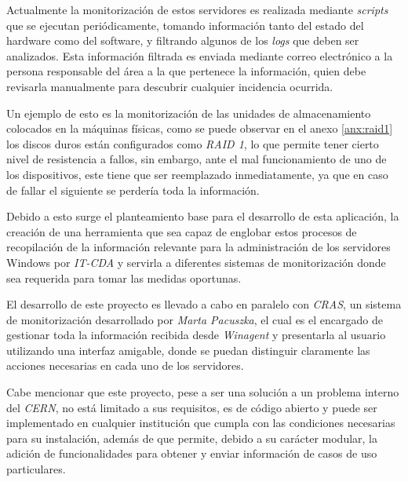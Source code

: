 Actualmente la monitorización de estos servidores es realizada mediante \textit{scripts} que se ejecutan periódicamente, tomando información tanto del estado del hardware como del software, y filtrando algunos de los \textit{logs} que deben ser analizados. Esta información filtrada es enviada mediante correo electrónico a la persona responsable del área a la que pertenece la información, quien debe revisarla manualmente para descubrir cualquier incidencia ocurrida.

Un ejemplo de esto es la monitorización de las unidades de almacenamiento colocados en la máquinas físicas, como se puede observar en el anexo \ref{anx:raid1} los discos duros están configurados como \textit{RAID 1}, lo que permite tener cierto nivel de resistencia a fallos, sin embargo, ante el mal funcionamiento de uno de los dispositivos, este tiene que ser reemplazado inmediatamente, ya que en caso de fallar el siguiente se perdería toda la información.



Debido a esto surge el planteamiento base para el desarrollo de esta aplicación, la creación de una herramienta que sea capaz de englobar estos procesos de recopilación de la información relevante para la administración de los servidores Windows  por \textit{IT-CDA} y servirla a diferentes sistemas de monitorización donde sea requerida para tomar las medidas oportunas.

El desarrollo de este proyecto es llevado a cabo en paralelo con \textit{CRAS}, un sistema de monitorización desarrollado por \textit{Marta Pacuszka}, el cual es el encargado de gestionar toda la información recibida desde \textit{Winagent} y presentarla al usuario utilizando una interfaz amigable, donde se puedan distinguir claramente las acciones necesarias en cada uno de los servidores.

Cabe mencionar que este proyecto, pese a ser una solución a un problema interno del \textit{CERN}, no está limitado a sus requisitos, es de código abierto y puede ser implementado en cualquier institución que cumpla con las condiciones necesarias para su instalación, además de que permite, debido a su carácter modular, la adición de funcionalidades para obtener y enviar información de casos de uso particulares.

